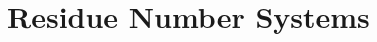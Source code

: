 \newcommand{\NTT}[1]{{#1}^{\mathsf{NTT}}}

\section{Residue Number Systems}
\label{sec:rns}

\newpage
